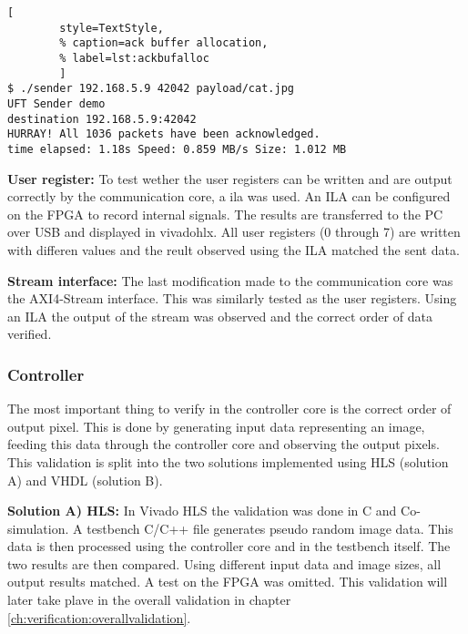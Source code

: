 \begin{minipage}{1\linewidth}
    \begin{lstlisting}[
        style=TextStyle, 
        % caption=ack buffer allocation, 
        % label=lst:ackbufalloc
        ]
$ ./sender 192.168.5.9 42042 payload/cat.jpg
UFT Sender demo
destination 192.168.5.9:42042
HURRAY! All 1036 packets have been acknowledged.
time elapsed: 1.18s Speed: 0.859 MB/s Size: 1.012 MB\end{lstlisting}
\end{minipage}

\vspace{1ex}
\textbf{User register:} To test wether the user registers can be written and are
output correctly by the communication core, a \gls{ila} 
was used. An ILA can be configured on the FPGA to record internal signals. The
results are transferred to the PC over USB and displayed in \gls{vivadohlx}. All
user registers (0 through 7) are written with differen values and the reult
observed using the ILA matched the sent data.

\vspace{1ex}
\textbf{Stream interface:} The last modification made to the communication core
was the AXI4-Stream interface. This was similarly tested as the user registers.
Using an ILA the output of the stream was observed and the correct order of data
verified. 

\subsubsection*{Controller} 
The most important thing to verify in the controller core is the correct order
of output pixel. This is done by generating input data representing an image,
feeding this data through the controller core and observing the output pixels.
This validation is split into the two solutions implemented using HLS (solution
A) and VHDL (solution B).

\vspace{1ex}
\textbf{Solution A) HLS:} In Vivado HLS the validation was done in C and
Co-simulation. A testbench C/C++ file generates pseudo random image data. This
data is then processed using the controller core and in the testbench itself.
The two results are then compared. Using different input data and image sizes,
all output results matched. A test on the FPGA was omitted. This validation will
later take plave in the overall validation in chapter \ref{ch:verification:overallvalidation}.

